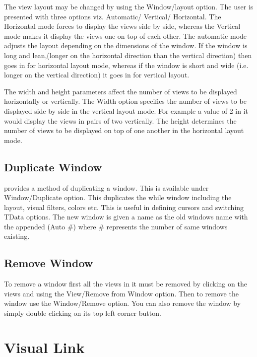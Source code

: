 The view layout may be changed by using the Window/layout option. The
user is presented with three options viz. Automatic/ Vertical/
Horizontal. The Horizontal mode forces \Devise to display the views
side by side, whereas the Vertical mode makes it display the views one
on top of each other. The automatic mode adjusts the layout depending
on the dimensions of the window. If the window is long and
lean,(longer on the horizontal direction than the vertical direction)
then \Devise goes in for horizontal layout mode, whereas if the window
is short and wide (i.e. longer on the vertical direction) it goes in
for vertical layout.

The width and height parameters affect the number of views to be
displayed horizontally or vertically. The Width option specifies the
number of views to be displayed side by side in the vertical layout
mode. For example a value of 2 in it would display the views in pairs
of two vertically. The height determines the number of views to be
displayed on top of one another in the horizontal layout mode.

\subsection{Duplicate Window}

\Devise provides a method of duplicating a window. This is available
under Window/Duplicate option. This duplicates the while window
including the layout, visual filters, colors etc. This is useful in
defining cursors and switching TData options. The new window is given
a name as the old windows name with the appended (Auto \#) where \#
represents the number of same windows existing.


\subsection{Remove Window}

To remove a window first all the views in it must be removed by
clicking on the views and using the View/Remove from Window
option. Then to remove the window use the Window/Remove option. You
can also remove the window by simply double clicking on its top left
corner button.


\section{Visual Link}

